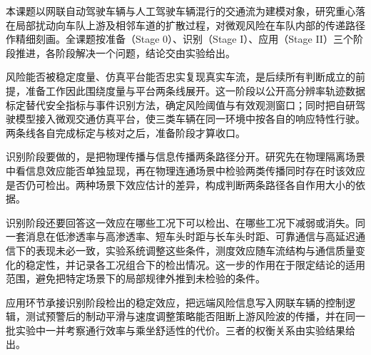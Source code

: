 \documentclass[oneside,doctype=proposal,fontset=windows,times=true]{tongjithesis}
\begin{document}
\tjformgap{31.47bp}%
\begin{tjformbody}
本课题以网联自动驾驶车辆与人工驾驶车辆混行的交通流为建模对象，研究重心落在局部扰动向车队上游及相邻车道的扩散过程，对微观风险在车队内部的传递路径作精细刻画\cite{wang2021}。全课题按准备（Stage 0）、识别（Stage I）、应用（Stage II）三个阶段推进，各阶段解决一个问题，结论交由实验给出。

风险能否被稳定度量、仿真平台能否忠实复现真实车流，是后续所有判断成立的前提，准备工作因此围绕度量与平台两条线展开。这一阶段以公开高分辨率轨迹数据标定替代安全指标与事件识别方法，确定风险阈值与有效观测窗口；同时把自研驾驶模型接入微观交通仿真平台，使三类车辆在同一环境中按各自的响应特性行驶。两条线各自完成标定与核对之后，准备阶段才算收口。

识别阶段要做的，是把物理传播与信息传播两条路径分开。研究先在物理隔离场景中看信息效应能否单独显现，再在物理连通场景中检验两类传播同时存在时该效应是否仍可检出。两种场景下效应估计的差异，构成判断两条路径各自作用大小的依据。

识别阶段还要回答这一效应在哪些工况下可以检出、在哪些工况下减弱或消失。同一套消息在低渗透率与高渗透率、短车头时距与长车头时距、可靠通信与高延迟通信下的表现未必一致，实验系统调整这些条件，测度效应随车流结构与通信质量变化的稳定性，并记录各工况组合下的检出情况。这一步的作用在于限定结论的适用范围，避免把特定场景下的局部规律外推到未检验的条件。

应用环节承接识别阶段检出的稳定效应，把远端风险信息写入网联车辆的控制逻辑，测试预警后的制动平滑与速度调整策略能否阻断上游风险波的传播，并在同一批实验中一并考察通行效率与乘坐舒适性的代价。三者的权衡关系由实验结果给出。
\end{tjformbody}
\end{document}
